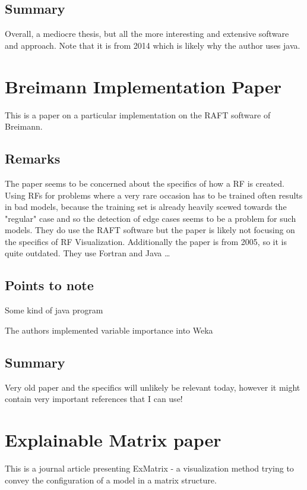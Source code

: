 \documentclass[a4paper, 12pt]{article}
\begin{document}
\subsection{Summary}
Overall, a mediocre thesis, but all the more interesting and extensive software and approach. Note that it is from
2014 which is likely why the author uses java.

\section{Breimann Implementation Paper}
This \cite{livingston2005implementation} is a paper on a particular implementation on the RAFT software of Breimann.
\subsection{Remarks}
The paper seems to be concerned about the specifics of how a RF is created. Using RFs for problems where a very
rare occasion has to be trained often results in bad models, because the training set is already heavily scewed
towards the "regular" case and so the detection of edge cases seems to be a problem for such models.
They do use the RAFT software but the paper is likely not focusing on the specifics of RF Visualization.
Additionally the paper is from 2005, so it is quite outdated. They use Fortran and Java \dots

\subsection{Points to note}
\begin{description}[font=$\bullet$~\normalfont]
    \item[Weka:] Some kind of java program
    \item[Variable Importance:] The authors implemented variable importance into Weka
\end{description}

\subsection{Summary}
Very old paper and the specifics will unlikely be relevant today, however it might contain very important
references that I can use!

\section{Explainable Matrix paper}
This \cite{neto2020explainable} is a journal article presenting ExMatrix - a visualization method trying to convey
the configuration of a model in a matrix structure.
\end{document}
